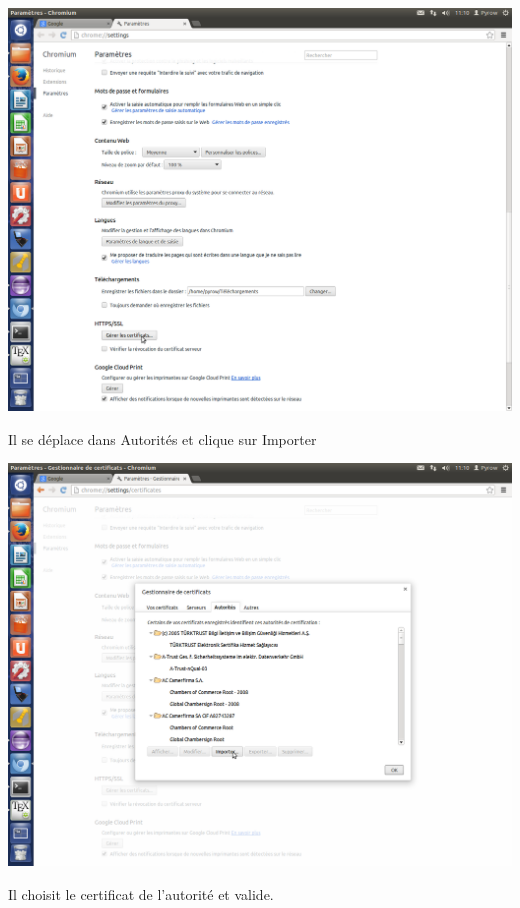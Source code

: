 \documentclass[a4paper,11pt,french]{article}
\begin{document}
\includegraphics[width=\textwidth]{images/ChromeCert.png} 
\newpage

Il se déplace dans Autorités et clique sur Importer

\includegraphics[width=\textwidth]{images/ChromeCA.png} 
\newpage

Il choisit le certificat de l'autorité et valide.
\end{document}
